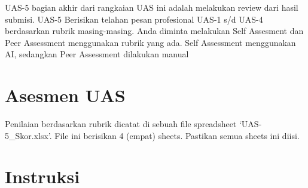 \documentclass[
  letterpaper,
  DIV=11,
  numbers=noendperiod]{scrreprt}
\begin{document}
UAS-5 bagian akhir dari rangkaian UAS ini adalah melakukan review dari
hasil submisi. UAS-5 Berisikan telahan pesan profesional UAS-1 s/d UAS-4
berdasarkan rubrik masing-masing. Anda diminta melakukan Self Assesment
dan Peer Assessment menggunakan rubrik yang ada. Self Assessment
menggunakan AI, sedangkan Peer Assessment dilakukan manual

\section*{Asesmen UAS}\label{asesmen-uas}


\begin{tcolorbox}[enhanced jigsaw, breakable, rightrule=.15mm, colbacktitle=quarto-callout-important-color!10!white, opacityback=0, titlerule=0mm, leftrule=.75mm, bottomrule=.15mm, toptitle=1mm, colframe=quarto-callout-important-color-frame, bottomtitle=1mm, arc=.35mm, coltitle=black, opacitybacktitle=0.6, toprule=.15mm, left=2mm, title=\textcolor{quarto-callout-important-color}{\faExclamation}\hspace{0.5em}{Important}, colback=white]

Penilaian berdasarkan rubrik dicatat di sebuah file spreadsheet
`UAS-5\_Skor.xlsx'. File ini berisikan 4 (empat) sheets. Pastikan semua
sheets ini diisi.

\end{tcolorbox}

\section*{Instruksi}\label{instruksi-2}

\end{document}
